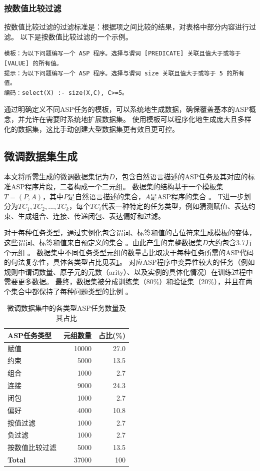 \subsubsection{按数值比较过滤}
按数值比较过滤的过滤标准是：根据项之间比较的结果，对表格中部分内容进行过滤。
以下是按数值比较过滤的一个示例。
\begin{lstlisting}
模板：为以下问题编写一个 ASP 程序。选择与谓词 [PREDICATE] 关联且值大于或等于 [VALUE] 的所有值。
提示：为以下问题编写一个 ASP 程序。选择与谓词 size 关联且值大于或等于 5 的所有值。
编码：select(X) :- size(X,C), C>=5。
\end{lstlisting}

通过明确定义不同ASP任务的模板，可以系统地生成数据，确保覆盖基本的ASP概念，并允许在需要时系统地扩展数据集。
使用模板可以程序化地生成庞大且多样化的数据集，这比手动创建大型数据集更有效且更可控。
\subsection{微调数据集生成}
本文将所需生成的微调数据集记为$D$，包含自然语言描述的ASP任务及其对应的标准ASP程序片段，二者构成一个二元组。
数据集的结构基于一个模板集$T = (P, A)$，其中$P$是自然语言描述的集合，$A$是ASP程序的集合 。
T进一步划分为${TC_1, TC_2,..., TC_k}$，每个$TC_i$代表一种特定的任务类型，例如猜测赋值、表达约束、生成组合、连接、传递闭包、表达偏好和过滤。

对于每种任务类型，通过实例化包含谓词、标签和值的占位符来生成模板的变体，这些谓词、标签和值来自预定义的集合 。由此产生的完整数据集$D$大约包含3.7万个元组 。
数据集中不同任务类型元组的数量占比取决于每种任务所需的ASP代码的句法复杂性，具体各类型占比见表\ref{tab:task-portion}。
对应ASP程序中变异性较大的任务（例如规则中谓词数量、原子元的元数（arity）、以及实例的具体化情况）在训练过程中需要更多数据。
最终，数据集被分成训练集（80\%）和验证集（20\%），并且在两个集合中都保持了每种问题类型的比例 。

\begin{table}[ht]
\centering
\begin{tabular}{lrr}
\toprule
\textbf{ASP任务类型} & \textbf{元组数量} & \textbf{占比(\%)} \\
\midrule
赋值          & 10000 & 27.0 \\
约束          &   5000 & 13.5 \\
组合         &   1000 & 2.7 \\
连接                &   9000 & 24.3 \\
闭包  &   1000 & 2.7 \\
偏好          &   4000 & 10.8 \\
按值过滤     &   1000 & 2.7 \\
负过滤  &   1000 & 2.7 \\
按数值比较过滤   &   5000 & 13.5 \\
\midrule
\textbf{Total}      & 37000 & 100 \\
\bottomrule
\end{tabular}
\caption{微调数据集中的各类型ASP任务数量及其占比}
\label{tab:task-portion}
\end{table}

